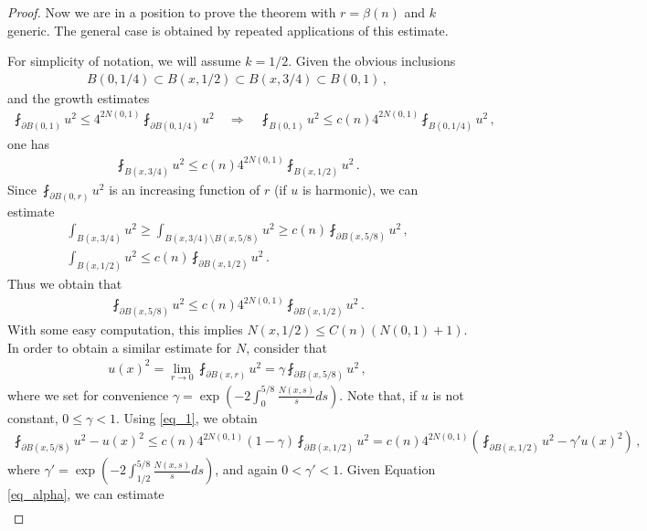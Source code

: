 \documentclass[11pt]{article}
\begin{document}
\begin{proof}
Now we are in a position to prove the theorem with $r=\beta(n)$ and $k$ generic. The general case is obtained by repeated applications of this estimate.

For simplicity of notation, we will assume $k=1/2$. Given the obvious inclusions
 \begin{gather}
  B(0,1/4)\subset B(x,1/2)\subset B(x,3/4)\subset B(0,1)\, ,
 \end{gather}
and the growth estimates
\begin{gather}
 \fint_{\partial B(0,1)} u^2 \leq 4^{2N(0,1)}\fint_{\partial B(0,1/4)} u^2 \quad \Longrightarrow \quad \fint_{B(0,1)} u^2 \leq c(n)4^{2N(0,1)}\fint_{B(0,1/4)} u^2\, ,
\end{gather}
one has
\begin{gather}
 \fint_{B(x,3/4)} u^2 \leq c(n)4^{2N(0,1)}\fint_{B(x,1/2)} u^2 \, .
\end{gather}
Since $\fint_{\partial B(0,r)} u^2$ is an increasing function of $r$ (if $u$ is harmonic), we can estimate
\begin{gather}
 \int_{B(x,3/4)} u^2 \geq \int_{B(x,3/4)\setminus B(x,5/8)} u^2 \geq c(n) \fint_{\partial B(x,5/8)} u^2\, ,\\
 \int_{B(x,1/2)}u^2 \leq c(n) \fint_{\partial B(x,1/2)} u^2\, .
\end{gather}
Thus we obtain that
\begin{gather}\label{eq_1}
 \fint_{\partial B(x,5/8)} u^2 \leq c(n) 4^{2N(0,1)} \fint_{\partial B(x,1/2)} u^2\, .
\end{gather}
With some easy computation, this implies $N(x,1/2)\leq C(n) (N(0,1)+1)$. In order to obtain a similar estimate for $ N$, consider that
\begin{gather}
 u(x)^2 = \lim_{r\to 0} \fint_{\partial B(x,r)} u^2 = \gamma\fint_{\partial B(x,5/8)} u^2\, ,
\end{gather}
where we set for convenience $\gamma = \exp{\left({-2\int_0^{5/8} \frac{N(x,s)}{s} ds }\right)}$. Note that, if $u$ is not constant, $0\leq \gamma<1$. Using \eqref{eq_1}, we obtain
\begin{gather}
\fint_{\partial B(x,5/8)} u^2-u(x)^2 \leq c(n) 4^{2N(0,1)} {\left({1-\gamma}\right)}\fint_{\partial B(x,1/2)} u^2 = c(n) 4^{2N(0,1)} {\left({\fint_{\partial B(x,1/2)} u^2 - \gamma' u(x)^2}\right)}\, ,
\end{gather}
where $\gamma'= \exp{\left({-2\int_{1/2}^{5/8} \frac{N(x,s)}{s} ds }\right)}$, and again $0<\gamma'<1$.
Given Equation \eqref{eq_alpha}, we can estimate
\begin{gather}\label{eq_2}

\end{gather}
\end{proof}
\end{document}
